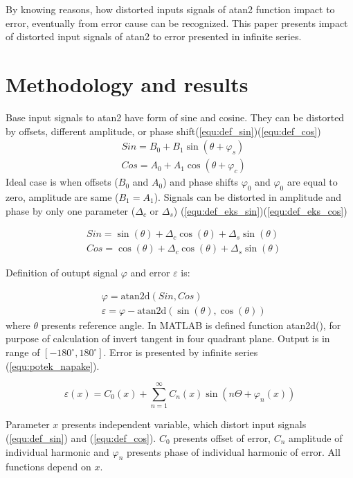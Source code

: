 \documentclass[a4paper]{article}
\begin{document}
By knowing reasons, how distorted inputs signals of atan2 function impact to error, eventually from error cause can be recognized. This paper presents impact of distorted input signals of atan2 to error presented in infinite series.
\section{Methodology and results}

Base input signals to atan2 have form of sine and cosine. They can be distorted by offsets, different amplitude, or phase shift(\ref{equ:def_sin})(\ref{equ:def_cos})
\begin{eqnarray}
\label{equ:def_sin}
&Sin = B_{0} + B_1 \sin(\theta + \varphi_{s})\\
\label{equ:def_cos}
&Cos = A_{0} + A_1 \cos(\theta + \varphi_{c})
\end{eqnarray}
Ideal case is when offsets ($B_0$ and $A_0$) and phase shifts $\varphi_0$ and $\varphi_0$  are equal to zero, amplitude are same ($B_1 = A_1$). Signals can be distorted in amplitude and phase by only one parameter ($\Delta_c$ or $\Delta_s$) (\ref{equ:def_eks_sin})(\ref{equ:def_eks_cos})

\begin{eqnarray}
\label{equ:def_eks_sin}
&Sin = \sin(\theta)+\Delta_c \cos(\theta)+\Delta_s \sin(\theta)\\
\label{equ:def_eks_cos}
&Cos =\cos(\theta)+\Delta_c \cos(\theta)+\Delta_s \sin(\theta)
\end{eqnarray}

Definition of outupt signal $\varphi$ and error $\varepsilon$ is:

\begin{eqnarray}
\label{equ:def_kot}
&\varphi = \mathrm{atan2d}(Sin,Cos)\\
\label{equ:def_err}
&\varepsilon =\varphi - \mathrm{atan2d}(\sin(\theta),\cos(\theta))
\end{eqnarray}
where $\theta$ presents reference angle. In MATLAB is defined function atan2d(), for purpose of calculation of invert tangent in four quadrant plane. Output is in range of $[-180^\circ,180^\circ]$\cite{atand}. Error is presented by infinite series (\ref{equ:potek_napake}).

\begin{equation}
\label{equ:potek_napake}
\varepsilon(x) = C_0(x) + \sum_{n=1}^{\infty} C_n(x) \sin(n \Theta+ \varphi_n(x))
\end{equation}

Parameter $x$ presents independent variable, which distort input signals (\ref{equ:def_sin}) and (\ref{equ:def_cos}). 
 $C_0$ presents offset of error, $C_n$ amplitude of individual harmonic and $\varphi_n$ presents phase of individual harmonic of error. All functions depend on $x$.
\end{document}
